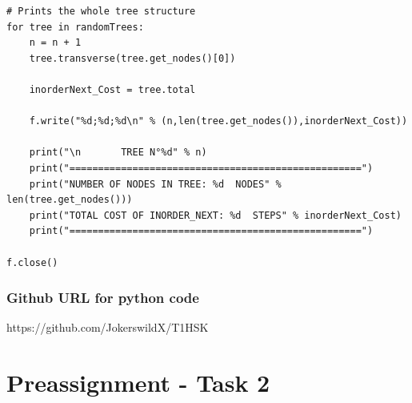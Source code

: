 \documentclass[12p]{report}
\begin{document}
\begin{lstlisting}
# Prints the whole tree structure
for tree in randomTrees:
	n = n + 1
	tree.transverse(tree.get_nodes()[0])

	inorderNext_Cost = tree.total

	f.write("%d;%d;%d\n" % (n,len(tree.get_nodes()),inorderNext_Cost))

	print("\n		TREE N°%d" % n)
	print("===================================================")
	print("NUMBER OF NODES IN TREE: %d  NODES" % len(tree.get_nodes()))
	print("TOTAL COST OF INORDER_NEXT: %d  STEPS" % inorderNext_Cost)
	print("===================================================")	

f.close()
\end{lstlisting}
 
\bigskip

  \subsection{Github URL for python code}
https://github.com/JokerswildX/T1HSK



  \chapter{Preassignment - Task 2}			%
\end{document}
